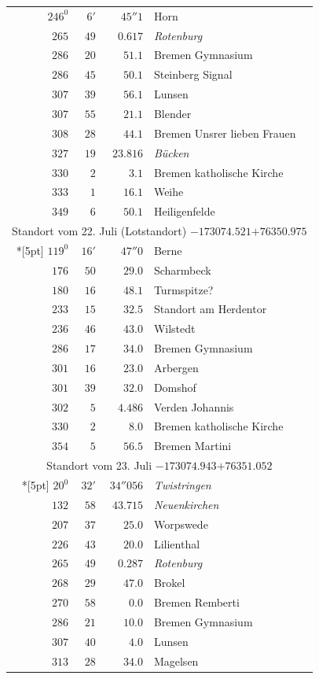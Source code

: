 \clearpage
{}%
\begingroup
\fontsize{10.5}{13}\selectfont
\setlength{\tabcolsep}{3pt}
\setlength{\LTpre}{2pt}
\setlength{\LTpost}{2pt}
\begin{longtable}{@{}rrrp{.61\linewidth}@{}}
\(246^{0}\)&\(6'\)&\(45''1\)&\raggedright Horn\tabularnewline
\(265\)&\(49\)&\(0.617\)&\raggedright \textit{Rotenburg}\tabularnewline
\(286\)&\(20\)&\(51.1\)&\raggedright Bremen Gymnasium\tabularnewline
\(286\)&\(45\)&\(50.1\)&\raggedright Steinberg Signal\tabularnewline
\(307\)&\(39\)&\(56.1\)&\raggedright Lunsen\tabularnewline
\(307\)&\(55\)&\(21.1\)&\raggedright Blender\tabularnewline
\(308\)&\(28\)&\(44.1\)&\raggedright Bremen Unsrer lieben Frauen\tabularnewline
\(327\)&\(19\)&\(23.816\)&\raggedright \textit{Bücken}\tabularnewline
\(330\)&\(2\)&\(3.1\)&\raggedright Bremen katholische Kirche\tabularnewline
\(333\)&\(1\)&\(16.1\)&\raggedright Weihe\tabularnewline
\(349\)&\(6\)&\(50.1\)&\raggedright Heiligenfelde\tabularnewline
\multicolumn{4}{c}{Standort vom 22. Juli (Lotstandort) \(-173074.521\)\qquad\(+76350.975\)}\\*[5pt]
\(119^{0}\)&\(16'\)&\(47''0\)&\raggedright Berne\tabularnewline
\(176\)&\(50\)&\(29.0\)&\raggedright Scharmbeck\tabularnewline
\(180\)&\(16\)&\(48.1\)&\raggedright Turmspitze?\tabularnewline
\(233\)&\(15\)&\(32.5\)&\raggedright Standort am Herdentor\tabularnewline
\(236\)&\(46\)&\(43.0\)&\raggedright Wilstedt\tabularnewline
\(286\)&\(17\)&\(34.0\)&\raggedright Bremen Gymnasium\tabularnewline
\(301\)&\(16\)&\(23.0\)&\raggedright Arbergen\tabularnewline
\(301\)&\(39\)&\(32.0\)&\raggedright Domshof\tabularnewline
\(302\)&\(5\)&\(4.486\)&\raggedright Verden Johannis\tabularnewline
\(330\)&\(2\)&\(8.0\)&\raggedright Bremen katholische Kirche\tabularnewline
\(354\)&\(5\)&\(56.5\)&\raggedright Bremen Martini\tabularnewline
\multicolumn{4}{c}{Standort vom 23. Juli \(-173074.943\)\qquad\(+76351.052\)}\\*[5pt]
\(20^{0}\)&\(32'\)&\(34''056\)&\raggedright \textit{Twistringen}\tabularnewline
\(132\)&\(58\)&\(43.715\)&\raggedright \textit{Neuenkirchen}\tabularnewline
\(207\)&\(37\)&\(25.0\)&\raggedright Worpswede\tabularnewline
\(226\)&\(43\)&\(20.0\)&\raggedright Lilienthal\tabularnewline
\(265\)&\(49\)&\(0.287\)&\raggedright \textit{Rotenburg}\tabularnewline
\(268\)&\(29\)&\(47.0\)&\raggedright Brokel\tabularnewline
\(270\)&\(58\)&\(0.0\)&\raggedright Bremen Remberti\tabularnewline
\(286\)&\(21\)&\(10.0\)&\raggedright Bremen Gymnasium\tabularnewline
\(307\)&\(40\)&\(4.0\)&\raggedright Lunsen\tabularnewline
\(313\)&\(28\)&\(34.0\)&\raggedright Magelsen\tabularnewline

\end{longtable}
